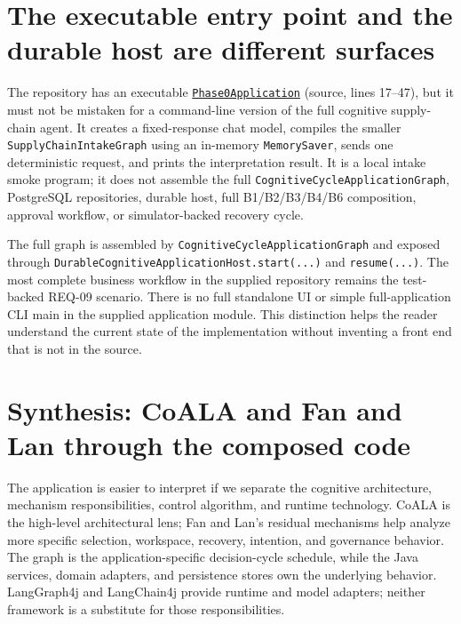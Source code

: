\section{The executable entry point and the durable host are different surfaces}
\label{sec:ch24-runnable-surface}

The repository has an executable \href{https://github.com/haythemabr/supply-chain-agent/blob/6329aec82e1d8b4f19b68986a0d4cf0c448f697f/supply-chain-agent-app/src/main/java/dev/supplychain/agent/app/Phase0Application.java}{\texttt{Phase0Application}} (source, lines 17--47), but it must not be mistaken for a command-line version of the full cognitive supply-chain agent. It creates a fixed-response chat model, compiles the smaller \texttt{SupplyChainIntakeGraph} using an in-memory \texttt{MemorySaver}, sends one deterministic request, and prints the interpretation result. It is a local intake smoke program; it does not assemble the full \texttt{CognitiveCycleAppli\allowbreak{}cationGraph}, PostgreSQL repositories, durable host, full B1/B2/B3/B4/B6 composition, approval workflow, or simulator-backed recovery cycle.

The full graph is assembled by \texttt{CognitiveCycle\allowbreak{}ApplicationGraph} and exposed through \texttt{DurableCognitive\allowbreak{}ApplicationHost.start(...)}\allowbreak{} and \texttt{resume(...)}. The most complete business workflow in the supplied repository remains the test-backed REQ-09 scenario. There is no full standalone UI or simple full-application CLI main in the supplied application module. This distinction helps the reader understand the current state of the implementation without inventing a front end that is not in the source.

\section{Synthesis: CoALA and Fan and Lan through the composed code}
\label{sec:ch24-synthesis}

The application is easier to interpret if we separate the cognitive architecture, mechanism responsibilities, control algorithm, and runtime technology. CoALA is the high-level architectural lens; Fan and Lan's residual mechanisms help analyze more specific selection, workspace, recovery, intention, and governance behavior. The graph is the application-specific decision-cycle schedule, while the Java services, domain adapters, and persistence stores own the underlying behavior. LangGraph4j and LangChain4j provide runtime and model adapters; neither framework is a substitute for those responsibilities.

